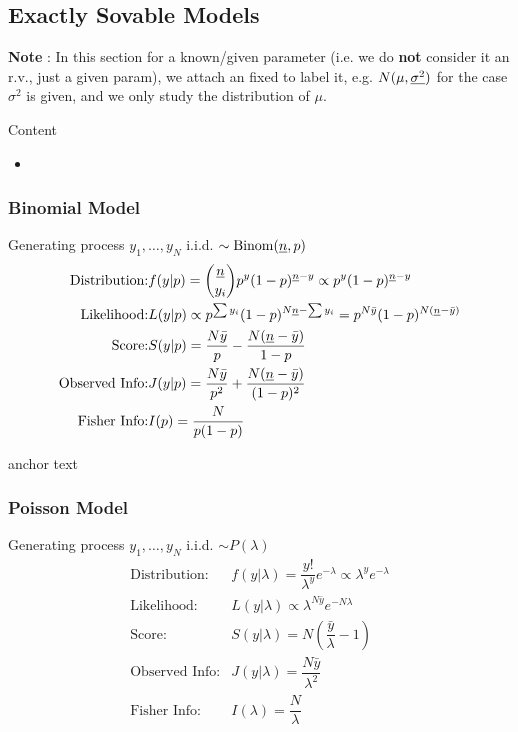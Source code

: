     



\subsection{Exactly Sovable Models}
\textbf{Note} : In this section for a known/given parameter (i.e. we do \textbf{not} consider it an r.v., just a given param), we attach an fixed to label it, e.g. $ N(\mu ,\underline{\sigma^2} ) $ for the case $ \sigma^2 $ is given, and we only study the distribution of $ \mu  $.

\begin{point}
    Content
\end{point}
\begin{itemize}[topsep=2pt,itemsep=0pt]
    \item 
\end{itemize}

    
\subsubsection{Binomial Model}\label{SubSubSectionBayesianBinomial}
Generating process $ y_1,\ldots,y_N $ i.i.d. $ \sim \mathrm{Binom}(\underline{n},p) $
\begin{align*}
    \text{Distribution:}&f(y|p)=\binom{\underline{n}}{y_i}p^{y}(1-p)^{\underline{n}-y}\propto p^y(1-p)^{\underline{n}-y}\\
    \text{Likelihood:}&L(y|p)\propto p^{\sum y_i}(1-p )^{N\underline{n}-\sum y_i}=p^{N\bar{y}}(1-p)^{N(\underline{n}-\bar{y})}\\
    \text{Score:}&S(y|p)=\dfrac{N\bar{y}}{p}- \dfrac{N(\underline{n}-\bar{y})}{1-p}\\
    \text{Observed Info:}&J(y|p)=\dfrac{N\bar{y}}{p^2}+\dfrac{N(\underline{n}-\bar{y})}{(1-p)^2}\\
    \text{Fisher Info:}&I(p)=\dfrac{N}{p(1-p)}
\end{align*}


\hypertarget{BinomConjugate}{anchor text}



\subsubsection{Poisson Model}\label{SubSubSectionBayesianPoisson}
Generating process $ y_1,\ldots,y_N $ i.i.d. $ \sim P(\lambda ) $
\begin{align*}
    \text{Distribution:}&f(y|\lambda )=\dfrac{y!}{\lambda ^y}e^{-\lambda }\propto\lambda ^ye^{-\lambda }\\
    \text{Likelihood:}&L(y|\lambda )\propto \lambda^{N\bar{y}}e^{-N\lambda } \\
    \text{Score:}&S(y|\lambda )=N(\dfrac{\bar{y}}{\lambda }-1)\\
    \text{Observed Info:}&J(y|\lambda )=\dfrac{N\bar{y}}{\lambda^2 }\\
    \text{Fisher Info:}&I(\lambda )=\dfrac{N}{\lambda }
\end{align*}



